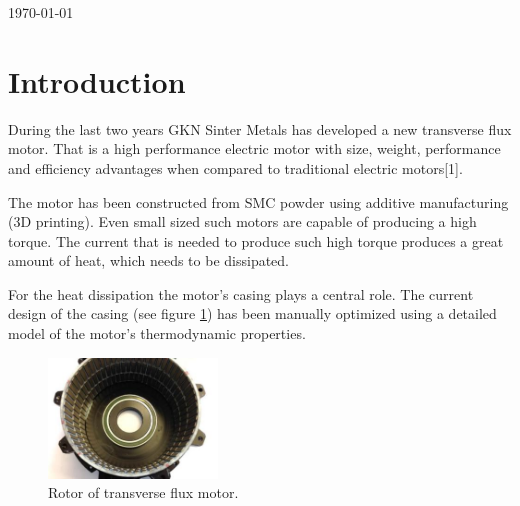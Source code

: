 \documentclass[12pt]{article}
\begin{document}
\begin{titlepage}


{\large \today}\\[3cm] %


 

\vfill %
\end{titlepage}

\section{Introduction}

During the last two years GKN Sinter Metals has developed a new transverse flux motor.
That is a high performance electric motor with size, weight, performance and efficiency advantages when compared to traditional electric motors[1].

The motor has been constructed from SMC powder using additive manufacturing (3D printing).
Even small sized such motors are capable of producing a high torque.
The current that is needed to produce such high torque produces a great amount of heat, which needs to be dissipated.

For the heat dissipation the motor's casing plays a central role.
The current design of the casing (see figure \ref{fig_casing}) has been manually optimized using a detailed model of the motor's thermodynamic properties.

\begin{figure}
	\centering
  \includegraphics[width=0.4\textwidth]{images/rotor.jpg}
	\caption{Rotor of transverse flux motor.}
	\label{fig_casing}
\end{figure}
\end{document}
